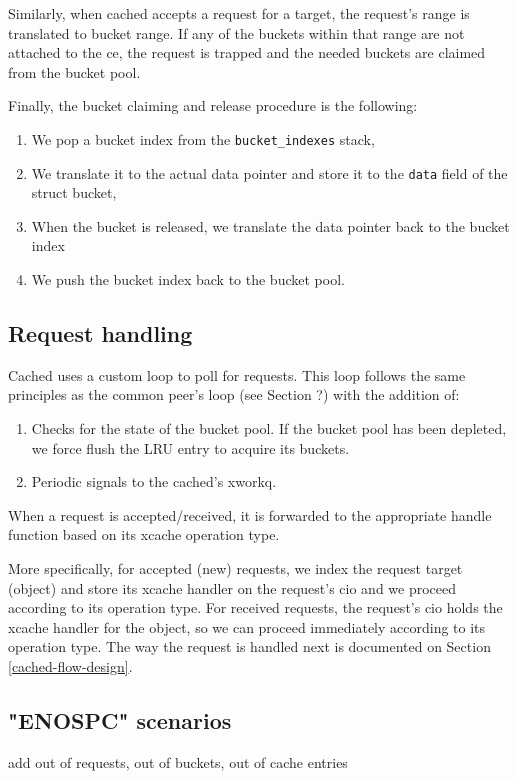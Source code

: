 Similarly, when cached accepts a request for a target, the request's range is 
translated to bucket range. If any of the buckets within that range are not 
attached to the ce, the request is trapped and the needed buckets are claimed 
from the bucket pool.

Finally, the bucket claiming and release procedure is the following:
\begin{enumerate}
\item We pop a bucket index from the \texttt{bucket\_indexes} stack,
\item We translate it to the actual data pointer and store it to the 
	\texttt{data} field of the struct bucket,
\item When the bucket is released, we translate the data pointer back to the 
	bucket index
\item We push the bucket index back to the bucket pool.
\end{enumerate}

\subsection{Request handling}

Cached uses a custom loop to poll for requests. This loop follows the same 
principles as the common peer's loop (see Section ?) with the addition of:

\begin{enumerate}
	\item Checks for the state of the bucket pool. If the bucket pool has 
		been depleted, we force flush the LRU entry to acquire its 
		buckets.
	\item Periodic signals to the cached's xworkq.
\end{enumerate}

When a request is accepted/received, it is forwarded to the appropriate handle 
function based on its xcache operation type.

More specifically, for accepted (new) requests, we index the request target 
(object) and store its xcache handler on the request's cio and we proceed 
according to its operation type. For received requests, the request's cio holds 
the xcache handler for the object, so we can proceed immediately according to 
its operation type. The way the request is handled next is documented on 
Section \ref{cached-flow-design}.

\subsection{"ENOSPC" scenarios}

\fixme add out of requests, out of buckets, out of cache entries
